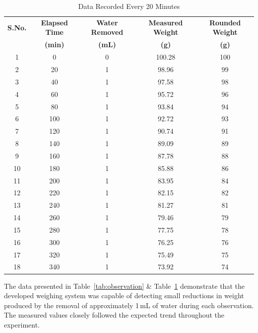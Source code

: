 \begin{table}[H]
\centering
\caption{Data Recorded Every 20 Minutes}
\label{tab:sensitivity_test}

\renewcommand{\arraystretch}{1.15}
\setlength{\arrayrulewidth}{0.6pt}

\begin{tabular}{|c|c|c|c|c|}
\hline
\textbf{S.No.} &
\textbf{Elapsed Time} &
\textbf{Water Removed} &
\textbf{Measured Weight} &
\textbf{Rounded Weight} \\

&
\textbf{(min)} &
\textbf{(mL)} &
\textbf{(g)} &
\textbf{(g)} \\
\hline

1  & 0   & 0 & 100.28 & 100 \\
2  & 20  & 1 & 98.96  & 99  \\
3  & 40  & 1 & 97.58  & 98  \\
4  & 60  & 1 & 95.72  & 96  \\
5  & 80  & 1 & 93.84  & 94  \\
6  & 100 & 1 & 92.72  & 93  \\
7  & 120 & 1 & 90.74  & 91  \\
8  & 140 & 1 & 89.09  & 89  \\
9  & 160 & 1 & 87.78  & 88  \\
10 & 180 & 1 & 85.88  & 86  \\
11 & 200 & 1 & 83.95  & 84  \\
12 & 220 & 1 & 82.15  & 82  \\
13 & 240 & 1 & 81.27  & 81  \\
14 & 260 & 1 & 79.46  & 79  \\
15 & 280 & 1 & 77.75  & 78  \\
16 & 300 & 1 & 76.25  & 76  \\
17 & 320 & 1 & 75.49  & 75  \\
18 & 340 & 1 & 73.92  & 74  \\
\hline

\end{tabular}
\end{table}

The data presented in Table~\ref{tab:observation}  \& Table~\ref{tab:sensitivity_test} demonstrate that the developed weighing system was capable of detecting small reductions in weight produced by the removal of approximately 1\,mL of water during each observation. The measured values closely followed the expected trend throughout the experiment.

